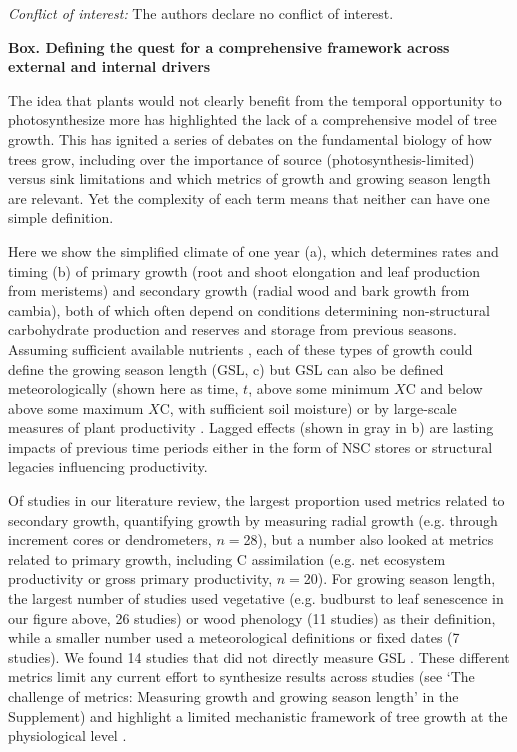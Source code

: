\documentclass[11pt]{article}
\begin{document}
\emph{Conflict of interest:} The authors declare no conflict of interest.  

\newpage
{\bf Box. Defining the quest for a comprehensive framework across external and internal drivers}

The idea that plants would not clearly benefit from the temporal opportunity to photosynthesize more has highlighted the lack of a comprehensive model of tree growth. This has ignited a series of debates on the fundamental biology of how trees grow, including over the importance of source (photosynthesis-limited) versus sink limitations \citep[plant growth-limited, but often via temperature, biophysical constraints, nutrients, and other arguably external factors,][]{korner2015paradigm,fatichi2019modelling,rademacher2022insights,cabon2022cross} and which metrics of growth and growing season length are relevant. Yet the complexity of each term means that neither can have one simple definition. 

Here we show the simplified climate of one year (a), which determines rates and timing (b) of primary growth (root and shoot elongation and leaf production from meristems) and secondary growth (radial wood and bark growth from cambia), both of which often depend on conditions determining non-structural carbohydrate \citep[NSC, which are sugars and starch needed for growth and an important area of study, for more details see][]{hartmann2016understanding,martinez2016dynamics,tixier2020comparison,luo2024internal} production and reserves and storage from previous seasons. Assuming sufficient available nutrients \citep{korner2015paradigm}, each of these types of growth could define the growing season length (GSL, c) but GSL can also be defined meteorologically (shown here as time, $t$, above some minimum $X$\degree C and below above some maximum $X$\degree C, with sufficient soil moisture) or by large-scale measures of plant productivity \citep{korner2023four}. Lagged effects (shown in gray in b) are lasting impacts of previous time periods either in the form of NSC stores or structural legacies influencing productivity. 

Of studies in our literature review, the largest proportion used metrics related to secondary growth, quantifying growth by measuring radial growth (e.g. through increment cores or dendrometers, $n=$28), but a number also looked at metrics related to primary growth, including C assimilation (e.g. net ecosystem productivity or gross primary productivity, $n=$20). For growing season length, the largest number of studies used vegetative (e.g. budburst to leaf senescence in our figure above, 26 studies) or wood phenology (11 studies) as their definition, while a smaller number used a meteorological definitions or fixed dates (7 studies). We found 14 studies that did not directly measure GSL \citep[e.g.][]{zhu2021different,dow2022warm,zohner2023effect}. These different metrics limit any current effort to synthesize results across studies (see `The challenge of metrics: Measuring growth and growing season length' in the Supplement) and highlight a limited mechanistic framework of tree growth at the physiological level \citep{korner2021tools,manzanedo2024moving}. 
\end{document}

